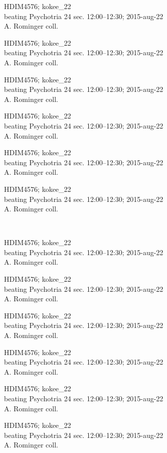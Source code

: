 \documentclass[2pt]{extarticle}
\begin{document}
\noindent
\parbox{0.16\textwidth}{\tiny \raggedright \rule[-0.3\baselineskip]{0pt}{10pt}HDIM4576; kokee\_22\\ beating Psychotria 24 sec. 12:00--12:30; 2015-aug-22\\ A. Rominger coll.}
\parbox{0.16\textwidth}{\tiny \raggedright \rule[-0.3\baselineskip]{0pt}{10pt}HDIM4576; kokee\_22\\ beating Psychotria 24 sec. 12:00--12:30; 2015-aug-22\\ A. Rominger coll.}
\parbox{0.16\textwidth}{\tiny \raggedright \rule[-0.3\baselineskip]{0pt}{10pt}HDIM4576; kokee\_22\\ beating Psychotria 24 sec. 12:00--12:30; 2015-aug-22\\ A. Rominger coll.}
\parbox{0.16\textwidth}{\tiny \raggedright \rule[-0.3\baselineskip]{0pt}{10pt}HDIM4576; kokee\_22\\ beating Psychotria 24 sec. 12:00--12:30; 2015-aug-22\\ A. Rominger coll.}
\parbox{0.16\textwidth}{\tiny \raggedright \rule[-0.3\baselineskip]{0pt}{10pt}HDIM4576; kokee\_22\\ beating Psychotria 24 sec. 12:00--12:30; 2015-aug-22\\ A. Rominger coll.}
\parbox{0.16\textwidth}{\tiny \raggedright \rule[-0.3\baselineskip]{0pt}{10pt}HDIM4576; kokee\_22\\ beating Psychotria 24 sec. 12:00--12:30; 2015-aug-22\\ A. Rominger coll.} \\ 
\vspace{0.001in} 

\noindent
\parbox{0.16\textwidth}{\tiny \raggedright \rule[-0.3\baselineskip]{0pt}{10pt}HDIM4576; kokee\_22\\ beating Psychotria 24 sec. 12:00--12:30; 2015-aug-22\\ A. Rominger coll.}
\parbox{0.16\textwidth}{\tiny \raggedright \rule[-0.3\baselineskip]{0pt}{10pt}HDIM4576; kokee\_22\\ beating Psychotria 24 sec. 12:00--12:30; 2015-aug-22\\ A. Rominger coll.}
\parbox{0.16\textwidth}{\tiny \raggedright \rule[-0.3\baselineskip]{0pt}{10pt}HDIM4576; kokee\_22\\ beating Psychotria 24 sec. 12:00--12:30; 2015-aug-22\\ A. Rominger coll.}
\parbox{0.16\textwidth}{\tiny \raggedright \rule[-0.3\baselineskip]{0pt}{10pt}HDIM4576; kokee\_22\\ beating Psychotria 24 sec. 12:00--12:30; 2015-aug-22\\ A. Rominger coll.}
\parbox{0.16\textwidth}{\tiny \raggedright \rule[-0.3\baselineskip]{0pt}{10pt}HDIM4576; kokee\_22\\ beating Psychotria 24 sec. 12:00--12:30; 2015-aug-22\\ A. Rominger coll.}
\parbox{0.16\textwidth}{\tiny \raggedright \rule[-0.3\baselineskip]{0pt}{10pt}HDIM4576; kokee\_22\\ beating Psychotria 24 sec. 12:00--12:30; 2015-aug-22\\ A. Rominger coll.} \\ 
\vspace{0.001in} 
\end{document}
